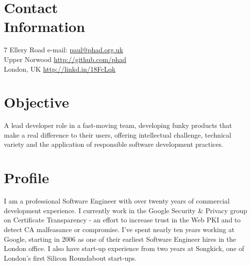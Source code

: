 \documentclass[line]{resume}
\begin{document}
\begin{resume}

    \section{\mysidestyle Contact\\Information}

    7 Ellery Road                          \hfill e-mail: \url{paul@phad.org.uk}            \vspace{0mm}\\\vspace{0mm}%
    Upper Norwood                          \hfill \url{http://github.com/phad}              \vspace{0mm}\\\vspace{0mm}%
    London, UK                             \hfill \url{http://linkd.in/18FcLqk}          \vspace{0mm}\\\vspace{-4.5mm}%

    \section{\mysidestyle Objective}

    A lead developer role in a fast-moving team, developing funky products that make a real difference to their users,
    offering intellectual challenge, technical variety and the application of responsible software development
    practices.

    \section{\mysidestyle Profile}

    I am a professional Software Engineer with over twenty years of commercial development experience.  I currently work
    in the Google Security \& Privacy group on Certificate Transparency - an effort to increase trust in the Web PKI and
    to detect CA malfeasance or compromise.  I've spent nearly ten years working at Google, starting in 2006 as one of
    their earliest Software Engineer hires in the London office.  I also have start-up experience from two years at
    Songkick, one of London's first Silicon Roundabout start-ups.


\end{resume}
\end{document}

